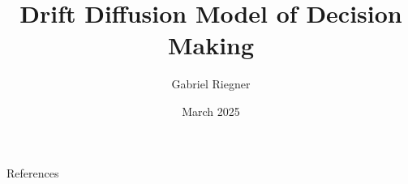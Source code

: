 \documentclass[12pt]{beamer}
\title{Drift Diffusion Model of Decision Making}
\author[]{Gabriel Riegner}
\date{March 2025}
\begin{document}
\begin{frame}{}
\end{frame}

\begin{frame}{References}
    \tiny
    
\end{frame}
\end{document}

